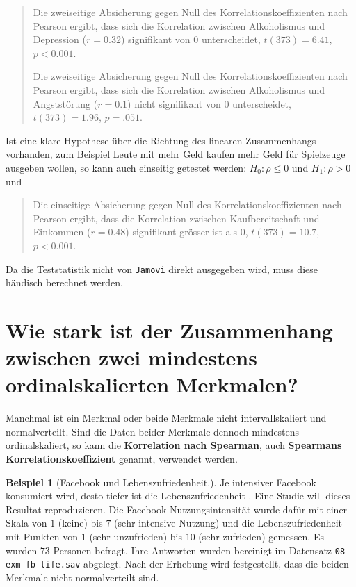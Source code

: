 \documentclass[
]{book}
\theoremstyle{definition}
\theoremstyle{definition}
\newtheorem{example}{Beispiel}[chapter]
\theoremstyle{definition}
\theoremstyle{definition}
\theoremstyle{remark}
\begin{document}
\begin{quote}
Die zweiseitige Absicherung gegen Null des Korrelationskoeffizienten nach Pearson ergibt, dass sich die Korrelation zwischen Alkoholismus und Depression (\(r = 0.32\)) signifikant von \(0\) unterscheidet, \(t(373) = 6.41\), \(p < 0.001\).

Die zweiseitige Absicherung gegen Null des Korrelationskoeffizienten nach Pearson ergibt, dass sich die Korrelation zwischen Alkoholismus und Angststörung (\(r = 0.1\)) nicht signifikant von \(0\) unterscheidet, \(t(373) = 1.96\), \(p = .051\).
\end{quote}

Ist eine klare Hypothese über die Richtung des linearen Zusammenhangs vorhanden, zum Beispiel Leute mit mehr Geld kaufen mehr Geld für Spielzeuge ausgeben wollen, so kann auch einseitig getestet werden: \(H_0: \rho \leq 0\) und \(H_1: \rho > 0\) und

\begin{quote}
Die einseitige Absicherung gegen Null des Korrelationskoeffizienten nach Pearson ergibt, dass die Korrelation zwischen Kaufbereitschaft und Einkommen (\(r = 0.48\)) signifikant grösser ist als \(0\), \(t(373) = 10.7\), \(p < 0.001\).
\end{quote}

Da die Teststatistik nicht von \texttt{Jamovi} direkt ausgegeben wird, muss diese händisch berechnet werden.

\section{Wie stark ist der Zusammenhang zwischen zwei mindestens ordinalskalierten Merkmalen?}\label{wie-stark-ist-der-zusammenhang-zwischen-zwei-mindestens-ordinalskalierten-merkmalen}

Manchmal ist ein Merkmal oder beide Merkmale nicht intervallskaliert und normalverteilt. Sind die Daten beider Merkmale dennoch mindestens ordinalskaliert, so kann die \label{customdef-spearman-korrelation}{\textbf{Korrelation nach Spearman}}, auch \textbf{Spearmans Korrelationskoeffizient} genannt, verwendet werden.

\begin{example}[Facebook und Lebenszufriedenheit.]
\protect\hypertarget{exm:fb-life}{}\label{exm:fb-life}Je intensiver Facebook konsumiert wird, desto tiefer ist die Lebenszufriedenheit \citep{blachnio2016}. Eine Studie will dieses Resultat reproduzieren. Die Facebook-Nutzungsintensität wurde dafür mit einer Skala von \(1\) (keine) bis \(7\) (sehr intensive Nutzung) und die Lebenszufriedenheit mit Punkten von \(1\) (sehr unzufrieden) bis \(10\) (sehr zufrieden) gemessen. Es wurden \(73\) Personen befragt. Ihre Antworten wurden bereinigt im Datensatz \texttt{08-exm-fb-life.sav} abgelegt. Nach der Erhebung wird festgestellt, dass die beiden Merkmale nicht normalverteilt sind.
\end{example}
\end{document}
